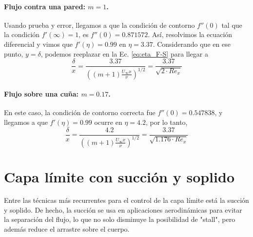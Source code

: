 \paragraph*{Flujo contra una pared: $m=1$.}
Usando prueba y error, llegamos a que la condición de contorno $f''(0)$ tal que la condición $f'(\infty)=1$, es $f''(0)=0.871572$.
Así, resolvimos la ecuación diferencial y vimos que $f'(\eta) = 0.99$ en $\eta=3.37$. 
Considerando que en ese punto, $y=\delta$, podemos reeplazar en la Ec. \eqref{eq:eta_F-S} para llegar a
%
\begin{equation}
\frac{\delta}{x}=\frac{3.37}{\left((m+1)\frac{U_\infty x}{\nu}\right)^{1/2}} = \frac{3.37}{\sqrt{2\cdot Re_x}} 
\end{equation}

\paragraph*{Flujo sobre una cuña: $m=0.17$.}
En este caso, la condición de contorno correcta fue $f''(0)=0.547838$, y llegamos a que $f'(\eta)=0.99$ ocurre en $\eta=4.2$, por lo tanto, 
%
\begin{equation}
\frac{\delta}{x}=\frac{4.2}{\left((m+1)\frac{U_\infty x}{\nu}\right)^{1/2}} = \frac{3.37}{\sqrt{1.176\cdot Re_x}} 
\end{equation}

\section*{Capa límite con succión y soplido}
Entre las técnicas más recurrentes para el control de la capa límite está la succión y soplido. De hecho, la succión se usa en aplicaciones aerodinámicas para evitar la separación del flujo, lo que no solo disminuye la posibilidad de "stall", pero además reduce el arrastre sobre el cuerpo.

